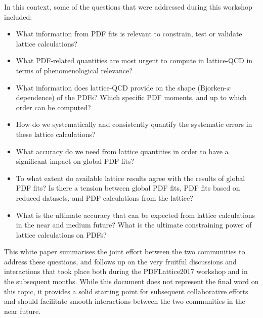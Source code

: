 In this context, some of the questions that were addressed during this workshop
included:
\begin{itemize}
\item What information from PDF fits is relevant to constrain, test or validate lattice calculations?

\item What PDF-related quantities are most urgent
  to compute in lattice-QCD in terms of phenomenological relevance?

\item What information does lattice-QCD provide on the
  shape (Bjorken-$x$ dependence) of the PDFs? Which specific
  PDF moments,
  and up to which order can be computed?
  
\item How do we systematically and consistently quantify the systematic errors in these lattice calculations?

\item What accuracy do we need from lattice quantities 
  in order to have a significant impact on global PDF fits?

\item To what extent do available lattice results agree with the results of
  global PDF fits? Is there a tension between global PDF fits, PDF
  fits based on reduced datasets, and PDF calculations from the lattice?

  \item What is the ultimate accuracy that can be expected from lattice
calculations in the near and medium future? What is the ultimate
constraining power of lattice calculations on PDFs?

\end{itemize}

This white paper summarises the joint
effort between the two communities to address these questions, 
and follows up on the very fruitful discussions and interactions that took place both during 
the PDFLattice2017 workshop and in the subsequent months.
%
While this document does not represent the final word on this topic,
it provides a solid starting point for subsequent collaborative efforts
and should facilitate smooth 
interactions between the two communities in the near future.

